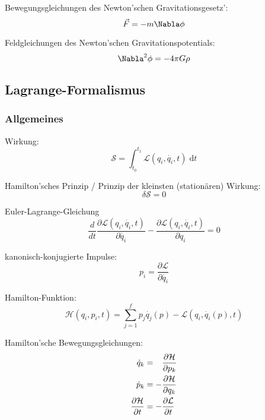 \documentclass[11pt]{article}
\numberwithin{equation}{section}
\begin{document}
        Bewegungsgleichungen des Newton'schen Gravitationsgesetz':
        \begin{equation}
          \vec{F}=-m\Nabla\phi
        \end{equation}

        Feldgleichungen des Newton'schen Gravitationspotentials:
        \begin{equation}
          \Nabla^2\phi=-4\pi G\rho
        \end{equation}

    \subsection{Lagrange-Formalismus}
      \subsubsection{Allgemeines}
        Wirkung:
        \begin{equation}
          \mathcal{S}=\int_{t_0}^{t_1}\mathcal{L}(q_i, \dot{q_i},t)\;\mathrm{d} t
        \end{equation}

        Hamilton'sches Prinzip / Prinzip der kleinsten (stationären) Wirkung:
        \begin{equation}
          \delta \mathcal{S}=0
        \end{equation}

        Euler-Lagrange-Gleichung
        \begin{equation}
           \frac{d}{dt} \frac{\partial \mathcal{L}(q_{i},\dot{q_{i}},t)}{\partial \dot{q_{i}}} - \frac{\partial \mathcal{L}(q_{i},\dot{q_{i}},t)}{\partial q_{i}} = 0
        \end{equation}

        kanonisch-konjugierte Impulse:
        \begin{equation}
          p_i=\frac{\partial \mathcal{L}}{\partial\dot{q_i}}
        \end{equation}

        Hamilton-Funktion:
        \begin{equation}
          \mathcal{H}(q_i,p_i,t)=\sum_{j=1}^{f}p_j\dot{q_j}(p) - \mathcal{L}(q_i, \dot{q_i}(p),t)
        \end{equation}

        Hamilton'sche Bewegungsgleichungen:
        \begin{equation}
          \begin{aligned}
            \dot{q}_k &= \phantom{-}\frac{\partial \mathcal{H}}{\partial p_k} \\
            \dot{p}_k &= -\frac{\partial \mathcal{H}}{\partial q_k} \\
            \frac{\partial \mathcal{H}}{\partial t} &= -\frac{\partial \mathcal{L}}{\partial t} \\
          \end{aligned}
        \end{equation}
\end{document}
